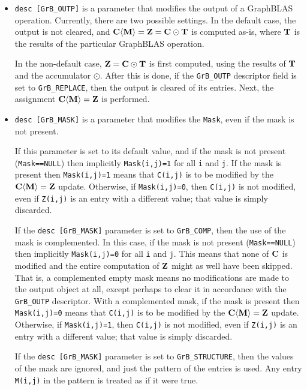 \documentclass[12pt]{article}
\begin{document}
\begin{itemize}
\item \verb'desc [GrB_OUTP]' is a parameter that modifies the output of a
    GraphBLAS operation.  Currently, there are two possible settings.  In the
    default case, the output is not cleared, and ${\bf C \langle M \rangle = Z
    = C \odot T}$ is computed as-is, where ${\bf T}$ is the results of the
    particular GraphBLAS operation.

    In the non-default case, ${\bf Z = C \odot T}$ is first computed, using the
    results of ${\bf T}$ and the accumulator $\odot$.  After this is done, if
    the \verb'GrB_OUTP' descriptor field is set to \verb'GrB_REPLACE', then the
    output is cleared of its entries.  Next, the assignment ${\bf C \langle M
    \rangle = Z}$ is performed.

\item \verb'desc [GrB_MASK]' is a parameter that modifies the \verb'Mask',
    even if the mask is not present.

    If this parameter is set to its default value, and if the mask is not
    present (\verb'Mask==NULL') then implicitly \verb'Mask(i,j)=1' for all
    \verb'i' and \verb'j'.  If the mask is present then \verb'Mask(i,j)=1'
    means that \verb'C(i,j)' is to be modified by the ${\bf C \langle M \rangle
    = Z}$ update.  Otherwise, if \verb'Mask(i,j)=0', then \verb'C(i,j)' is not
    modified, even if \verb'Z(i,j)' is an entry with a different value; that
    value is simply discarded.

    If the \verb'desc [GrB_MASK]' parameter is set to \verb'GrB_COMP', then the
    use of the mask is complemented.  In this case, if the mask is not present
    (\verb'Mask==NULL') then implicitly \verb'Mask(i,j)=0' for all \verb'i' and
    \verb'j'.  This means that none of ${\bf C}$ is modified and the entire
    computation of ${\bf Z}$ might as well have been skipped.  That is, a
    complemented empty mask means no modifications are made to the output
    object at all, except perhaps to clear it in accordance with the
    \verb'GrB_OUTP' descriptor.  With a complemented mask, if the mask is
    present then \verb'Mask(i,j)=0' means that \verb'C(i,j)' is to be modified
    by the ${\bf C \langle M \rangle = Z}$ update.  Otherwise, if
    \verb'Mask(i,j)=1', then \verb'C(i,j)' is not modified, even if
    \verb'Z(i,j)' is an entry with a different value; that value is simply
    discarded.

    If the \verb'desc [GrB_MASK]' parameter is set to \verb'GrB_STRUCTURE',
    then the values of the mask are ignored, and just the pattern of the
    entries is used.  Any entry \verb'M(i,j)' in the pattern is treated as if
    it were true.


\end{itemize}
\end{document}
